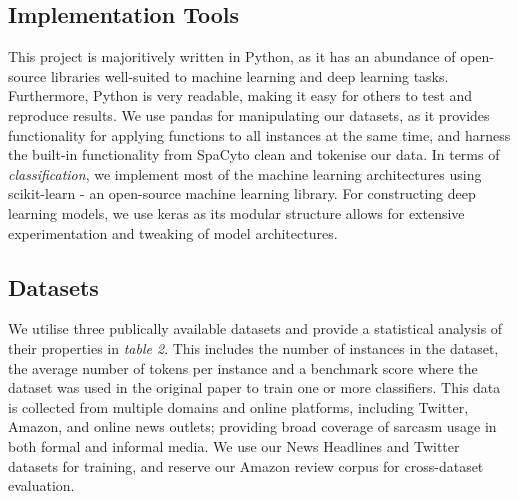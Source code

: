 \documentclass[12pt,a4paper]{article}
\begin{document}
\subsection{Implementation Tools}\vspace{-4.2pt}
\noindent This project is majoritively written in Python, as it has an abundance of open-source libraries well-suited to machine learning and deep learning tasks. Furthermore, Python is very readable, making it easy for others to test and reproduce results. We use pandas for manipulating our datasets, as it provides functionality for applying functions to all instances at the same time, and harness the built-in functionality from SpaCy\footnotemark[3] to clean and tokenise our data. In terms of \textit{classification}, we implement most of the machine learning architectures using scikit-learn \cite{mckinney-proc-scipy-2010} - an open-source machine learning library. For constructing deep learning models, we use keras as its modular structure allows for extensive experimentation and tweaking of model architectures.

\subsection{Datasets}
\vspace{-4.2pt}\noindent We utilise three publically available datasets and provide a statistical analysis of their properties in \textit{table 2}. This includes the number of instances in the dataset, the average number of tokens per instance and a benchmark score where the dataset was used in the original paper to train one or more classifiers. This data is collected from multiple domains and online platforms, including Twitter, Amazon, and online news outlets; providing broad coverage of sarcasm usage in both formal and informal media. We use our News Headlines and Twitter datasets for training, and reserve our Amazon review corpus for cross-dataset evaluation.\vspace{-5pt}
\end{document}
